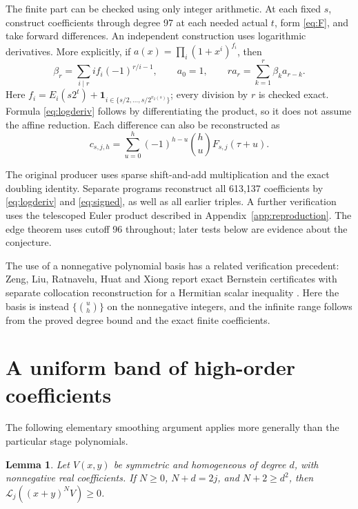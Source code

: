 \documentclass[11pt]{article}
\newtheorem{lemma}[theorem]{Lemma}
\newcommand{\Lfun}{\mathcal L}
\newcommand{\ind}{\mathbf 1}
\begin{document}
The finite part can be checked using only integer arithmetic. At each
fixed $s$, construct coefficients through degree 97 at each needed actual
$t$, form \eqref{eq:F}, and take forward differences. An independent
construction uses logarithmic derivatives. More explicitly, if
$a(x)=\prod_i(1+x^i)^{f_i}$, then
\begin{equation}\label{eq:logderiv}
 \beta_r=\sum_{i\mid r} i f_i(-1)^{r/i-1},\qquad
 a_0=1,\qquad r a_r=\sum_{k=1}^r\beta_k a_{r-k}.
\end{equation}
Here $f_i=E_i(s2^t)+\ind_{i\in\{s/2,\ldots,s/2^{v_2(s)}\}}$;
every division by $r$ is checked exact. Formula \eqref{eq:logderiv}
follows by differentiating the product, so it does not assume the affine
reduction. Each difference can also be reconstructed as
\begin{equation}\label{eq:signed}
 c_{s,j,h}=\sum_{u=0}^h(-1)^{h-u}\binom hu F_{s,j}(\tau+u).
\end{equation}

The original producer uses sparse shift-and-add multiplication and the
exact doubling identity. Separate programs reconstruct all 613,137
coefficients by \eqref{eq:logderiv} and \eqref{eq:signed}, as well as all
earlier triples. A further verification uses the telescoped Euler product
described in Appendix~\ref{app:reproduction}. The edge theorem uses cutoff
96 throughout; later tests below are evidence about the conjecture.

The use of a nonnegative polynomial basis has a related verification
precedent: Zeng, Liu, Ratnavelu, Huat and Xiong report exact Bernstein
certificates with separate collocation reconstruction for a Hermitian
scalar inequality \cite{ZengGate}. Here the basis is instead
$\{\binom uh\}$ on the nonnegative integers, and the infinite range follows
from the proved degree bound and the exact finite coefficients.

\section{A uniform band of high-order coefficients}

The following elementary smoothing argument applies more generally than
the particular stage polynomials.

\begin{lemma}\label{lem:smoothing}
Let $V(x,y)$ be symmetric and homogeneous of degree $d$, with nonnegative
real coefficients. If $N\geq0$, $N+d=2j$, and $N+2\geq d^2$, then
$\Lfun_j((x+y)^NV)\geq0$.
\end{lemma}
\end{document}
